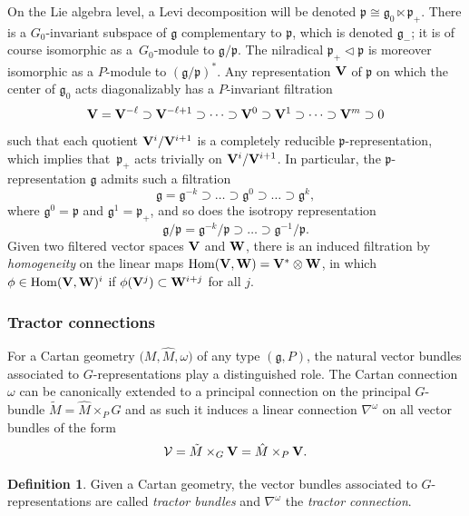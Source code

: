 \documentclass[pdftex]{sigma}
\numberwithin{equation}{section}
\theoremstyle{definition}
\newtheorem{defin}[thm]{Definition}
\def\g{{\mathfrak g}}
\def\p{{\mathfrak p}}
\begin{document}
On the Lie algebra level, a Levi decomposition will be denoted $\p \cong \g_0 \ltimes \p_+$. There is a $G_0$-invariant subspace of $\g$ complementary to $\p$, which is denoted $\g_-$; it is of course isomorphic as a~$G_0$-module to $\g/\p$. The nilradical $\p_+ \lhd \p$ is moreover isomorphic as a $P$-module to $(\g/\p)^*$. Any representation $\bf V$ of $\p$ on which the center of $\g_0$ acts diagonalizably
has
 a $P$-invariant filtration
\begin{equation}\label{filtration_rep}
{\bf V}={\bf V}^{-\ell}\supset {\bf V}^{- \ell+1}\supset \cdots \supset {\bf V}^0\supset {\bf V}^{1}\supset \cdots \supset {\bf V}^{m} \supset 0
\end{equation}
such that each quotient ${\bf V}^{i}/{\bf V}^{i+1}$ is a completely reducible $\p$-representation, which implies that~$\p_+$ acts trivially on ${\bf V}^{i}/{\bf V}^{i+1}$.
In particular, the $\p$-representation $\g$ admits such a filtration
 \begin{equation*}
 \g=\g^{-k}\supset\dots \supset \g^0\supset\dots \supset \g^k,
 \end{equation*}
 where $\g^0=\p$ and $\g^1=\p_+$, and so does the isotropy representation
 \begin{equation}\label{filtr_g/p}
 \g/\p=\g^{-k}/\p\supset\dots \supset \g^{-1}/\p.
\end{equation}
Given two filtered vector spaces $\bf V$ and $\bf W$, there is an induced filtration by \emph{homogeneity} on the linear maps $\operatorname{Hom}({\bf V},{\bf W})={\bf V}^*\otimes {\bf W}$,
in which $\phi\in\operatorname{Hom}({\bf V},{\bf W})^i$ if $\phi({\bf V}^j)\subset {\bf W}^{i+j}$ for all $j$.

\subsubsection{Tractor connections}
\label{sec.tractor.connxns}
For a Cartan geometry $\bigl(M,\hat{M}, \omega\bigr)$ of any type $(\g,P)$, the natural vector bundles associated to $G$-representations play a distinguished role.
The Cartan connection $\omega$ can be canonically extended to a principal connection on the principal $G$-bundle $\tilde{M}= \hat{M} \times_PG$ and as such it induces a linear connection
$\nabla^\omega$ on all vector bundles of the form
\[\mathcal V=\tilde{M} \times_G{\bf V}= \hat{M} \times_P{\bf V}.\]
\begin{defin} Given a Cartan geometry,
the vector bundles associated to $G$-representations are called \emph{tractor bundles} and $\nabla^\omega$ the \emph{tractor connection}.
\end{defin}
\end{document}
